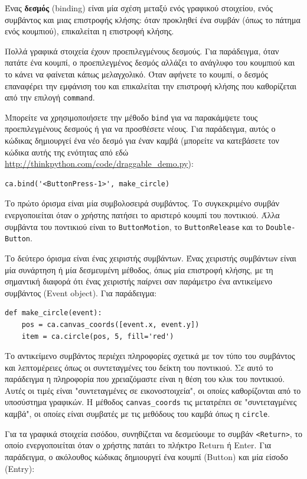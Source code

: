 \documentclass[10pt]{book}
\begin{document}
Ένας {\bf δεσμός} (binding) είναι μία σχέση μεταξύ ενός γραφικού στοιχείου, ενός 
συμβάντος και μιας επιστροφής κλήσης: όταν προκληθεί ένα συμβάν (όπως το πάτημα ενός 
κουμπιού), επικαλείται η επιστροφή κλήσης.  

Πολλά γραφικά στοιχεία έχουν προεπιλεγμένους δεσμούς.  Για παράδειγμα, όταν πατάτε ένα 
κουμπί, ο προεπιλεγμένος δεσμός αλλάζει το ανάγλυφο του κουμπιού και το κάνει να φαίνεται 
κάπως μελαγχολικό.  Όταν αφήνετε το κουμπί, ο δεσμός επαναφέρει την εμφάνιση του και επικαλείται 
την επιστροφή κλήσης που καθορίζεται από την επιλογή {\tt command}.

Μπορείτε να χρησιμοποιήσετε την μέθοδο {\tt bind} για να παρακάμψετε τους προεπιλεγμένους
δεσμούς ή για να προσθέσετε νέους.  Για παράδειγμα, αυτός ο κώδικας δημιουργεί ένα νέο δεσμό
για έναν καμβά (μπορείτε να κατεβάσετε τον κώδικα αυτής της ενότητας από εδώ \url{http://thinkpython.com/code/draggable_demo.py}):

\begin{verbatim}
ca.bind('<ButtonPress-1>', make_circle)
\end{verbatim}
%
Το πρώτο όρισμα είναι μία συμβολοσειρά συμβάντος. Το συγκεκριμένο συμβάν ενεργοποιείται όταν ο χρήστης 
πατήσει το αριστερό κουμπί του ποντικιού. Άλλα συμβάντα του ποντικιού είναι το {\tt ButtonMotion},
το {\tt ButtonRelease} και το {\tt Double-Button}.

Το δεύτερο όρισμα είναι ένας χειριστής συμβάντων.  Ένας χειριστής συμβάντων είναι μία 
συνάρτηση ή μία δεσμευμένη μέθοδος, όπως μία επιστροφή κλήσης, με τη σημαντική διαφορά 
ότι ένας χειριστής παίρνει σαν παράμετρο ένα αντικείμενο συμβάντος (Event object).
Για παράδειγμα:

\begin{verbatim}
def make_circle(event):
    pos = ca.canvas_coords([event.x, event.y])
    item = ca.circle(pos, 5, fill='red')
\end{verbatim}
%
Το αντικείμενο συμβάντος περιέχει πληροφορίες σχετικά με τον τύπο του συμβάντος και λεπτομέρειες
όπως οι συντεταγμένες του δείκτη του ποντικιού.  Σε αυτό το παράδειγμα η πληροφορία που χρειαζόμαστε
είναι η θέση του κλικ του ποντικιού.  Αυτές οι τιμές είναι "συντεταγμένες σε εικονοστοιχεία",
οι οποίες καθορίζονται από το υποσύστημα γραφικών.  Η μέθοδος \verb"canvas_coords" τις μετατρέπει
σε "συντεταγμένες καμβά", οι οποίες είναι συμβατές με τις μεθόδους του καμβά όπως η {\tt circle}.

Για τα γραφικά στοιχεία εισόδου, συνηθίζεται να δεσμεύουμε το συμβάν \verb"<Return>",
το οποίο ενεργοποιείται όταν ο χρήστης πατάει το πλήκτρο {\sf Return} ή {\sf Enter}.
Για παράδειγμα, ο ακόλουθος κώδικας δημιουργεί ένα κουμπί (Button) και μία είσοδο (Entry):
\end{document}
